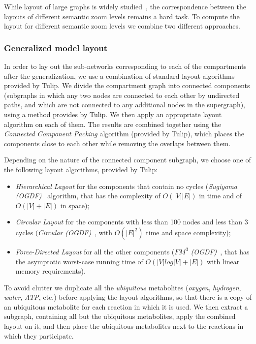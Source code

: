 \documentclass{bmcart}
\begin{document}
While layout of large graphs is widely studied~\cite{Unwin2006}, the correspondence between the layouts of different semantic zoom levels remains a hard task. To compute the layout for different semantic zoom levels we combine two different approaches.

\subsubsection*{Generalized model layout}
In order to lay out the sub-networks corresponding to each of the compartments after the generalization, we use a combination of standard layout algorithms provided by Tulip. We divide the compartment graph into connected components (subgraphs in which any two nodes are connected to each other by undirected paths, and which are not connected to any additional nodes in the supergraph), using a method provides by Tulip. We then apply an appropriate layout algorithm on each of them. The results are combined together using the \emph{Connected Component Packing} algorithm (provided by Tulip), which places the components close to each other while removing the overlaps between them.

Depending on the nature of the connected component subgraph, we choose one of the following layout algorithms, provided by Tulip:
\begin{itemize}
\item \emph{Hierarchical Layout} for the components that contain no cycles (\emph{Sugiyama (OGDF)}~\cite{Sugiyama1981} algorithm, that has the complexity of $O(|V||E|)$ in time and of $O(|V| + |E|)$ in space);
\item \emph{Circular Layout} for the components with less than 100 nodes and less than 3 cycles (\emph{Circular (OGDF)}~\cite{Tamassia:2007:HGD:1202383}, with $O(|E|^2)$ time and space complexity);
\item \emph{Force-Directed Layout} for all the other components (\emph{$FM^3$ (OGDF)}~\cite{Hachul2005}, that has the asymptotic worst-case running time of $O(|V|log|V|+|E|)$ with linear memory requirements).
\end{itemize}

To avoid clutter we duplicate all the \emph{ubiquitous} metabolites (\textit{oxygen}, \textit{hydrogen}, \textit{water}, \textit{ATP}, etc.) before applying the layout algorithms, so that there is a copy of an ubiquitous metabolite for each reaction in which it is used. We then extract a subgraph, containing all but the ubiquitous metabolites, apply the combined layout on it, and then place the ubiquitous metabolites next to the reactions in which they participate. 
\end{document}
